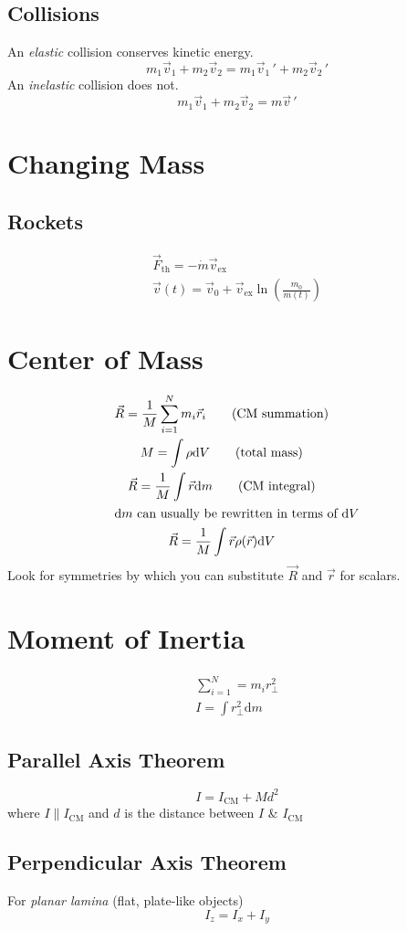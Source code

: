 \documentclass{cheatsheet}
\begin{document}
		\subsection{Collisions}
			An \emph{elastic} collision conserves kinetic energy.
			\[
				m_1\vec v_1 + m_2\vec v_2 = m_1\vec v_1\,' + m_2\vec v_2\,'
			\]
			An \emph{inelastic} collision does not.
			\[
				m_1\vec v_1 + m_2\vec v_2 = m\vec v\,'
			\]
	\section{Changing Mass}
		\subsection{Rockets}
			\begin{gather*}
				\vec F_\mathrm{th} = -\dot{m}\vec v_\mathrm{ex}		\tag{thrust}\\
				\vec v(t) = \vec v_0 + \vec v_\mathrm{ex}\ln\left( \frac{m_0}{m(t)} \right)	\tag{$\Delta V$}
			\end{gather*}
	\section{Center of Mass}
	\begin{gather*}
		\vec R = \frac{1}{M}\sum_{i=1}^N m_i \vec r_i	\tag{CM summation}\raisetag{-10pt}\\
		M = \int \rho \mathrm{d}V	\tag{total mass}\\
		\vec R =  \frac{1}{M}  \int \vec r \mathrm{d}m \tag{CM integral}\raisetag{-6pt}\\
	\intertext{$\mathrm{d}m$ can usually be rewritten in terms of $\mathrm{d}V$}
		\vec R = \frac{1}{M} \int \vec r \rho(\vec r) \mathrm{d}V
	\end{gather*}
	Look for symmetries by which you can substitute $\vec R$ and $\vec r$ for scalars.

	\section{Moment of Inertia}
	\begin{gather*}
		\sum_{i=1}^{N} = m_i r^2_\perp \tag{summation}\\
		I = \int r^2_\perp \mathrm{d}m	\tag{integral}
	\end{gather*}
		\subsection{Parallel Axis Theorem}
			\[ I = I_\mathrm{CM} + Md^2 \]
			where $I \parallel I_\mathrm{CM}$ and $d$ is the distance between $I$ \& $I_\mathrm{CM}$

		\subsection{Perpendicular Axis Theorem}
			For \emph{planar lamina} (flat, plate-like objects)
			\[ I_z = I_x + I_y \]
\end{document}
